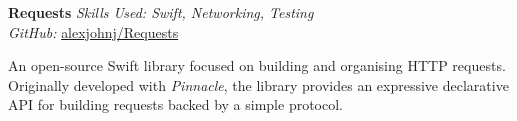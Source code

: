 \textbf{Requests}  \newline
\textit{Skills Used: Swift, Networking, Testing}\\
\textit{GitHub:} \href{https://github.com/\myweb/requests}{alexjohnj/Requests}

An open-source Swift library focused on building and organising HTTP
requests. Originally developed with \textit{Pinnacle}, the library provides an
expressive declarative API for building requests backed by a simple protocol.

